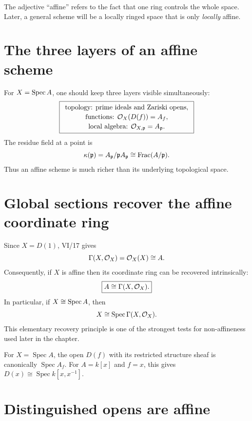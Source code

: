The adjective ``affine'' refers to the fact that one ring controls the whole space.  Later,
a general scheme will be a locally ringed space that is only \emph{locally} affine.



\section{The three layers of an affine scheme}

For $X=\operatorname{Spec} A$, one should keep three layers visible simultaneously:
\[
\boxed{
\begin{array}{c}
\text{topology: prime ideals and Zariski opens},\\[2pt]
\text{functions: }\mathcal O_X(D(f))=A_f,\\[2pt]
\text{local algebra: }\mathcal O_{X,\mathfrak p}=A_{\mathfrak p}.
\end{array}}
\]
The residue field at a point is
\[
\kappa(\mathfrak p)=A_{\mathfrak p}/\mathfrak p A_{\mathfrak p}\cong\operatorname{Frac}(A/\mathfrak p).
\]
Thus an affine scheme is much richer than its underlying topological space.

\section{Global sections recover the affine coordinate ring}

Since $X=D(1)$, VI/17 gives
\[
\Gamma(X,\mathcal O_X)=\mathcal O_X(X)\cong A.
\]
Consequently, if $X$ is affine then its coordinate ring can be recovered intrinsically:
\[
\boxed{A\cong\Gamma(X,\mathcal O_X).}
\]
In particular, if $X\cong\operatorname{Spec} A$, then
\[
X\cong\operatorname{Spec}\Gamma(X,\mathcal O_X).
\]
This elementary recovery principle is one of the strongest tests for non-affineness used
later in the chapter.



\begin{example}\label{ex:vi18-expand-01}
For $X=\operatorname{Spec}A$, the open $D(f)$ with its restricted structure sheaf is canonically $\operatorname{Spec}A_f$.  For $A=k[x]$ and $f=x$, this gives $D(x)\cong\operatorname{Spec}k[x,x^{-1}]$.
\end{example}
\section{Distinguished opens are affine}

